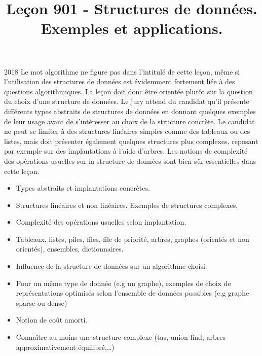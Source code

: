 \documentclass{agregfiche}
\title{Leçon 901 - Structures de données. Exemples et applications.}
\begin{document}
\maketitle

\secrapports
\begin{rapport}{2018}
	Le mot algorithme ne figure pas dans l’intitulé de cette leçon, même si l’utilisation des structures de
	données est évidemment fortement liée à des questions algorithmiques. La leçon doit donc être orientée
	plutôt sur la question du choix d’une structure de données. Le jury attend du candidat qu’il présente
	différents types abstraits de structures de données en donnant quelques exemples de leur usage avant de
	s’intéresser au choix de la structure concrète. Le candidat ne peut se limiter à des structures linéaires
	simples comme des tableaux ou des listes, mais doit présenter également quelques structures plus
	complexes, reposant par exemple sur des implantations à l’aide d’arbres. Les notions de complexité des
	opérations usuelles sur la structure de données sont bien sûr essentielles dans cette leçon.
\end{rapport}

\secindispensables

\begin{itemize}
	\item  Types abstraits et implantations concrètes.
    \item Structures linéaires et non linéaires. Exemples de structures complexes.
	\item Complexité des opérations usuelles selon implantation.
\end{itemize}

\secasavoir

\begin{itemize}
	\item  Tableaux, listes, piles, files, file de priorité, arbres, graphes (orientés et non orientés), ensembles, dictionnaires.
    \item Influence de la structure de données sur un algorithme choisi.
    \item Pour un même type de donnée (e.g un graphe), exemples de choix de représentations optimisés selon l'ensemble de données possibles (e.g graphe sparse ou dense)
	\item Notion de coût amorti.
    \item Connaître au moins une structure complexe (tas, union-find, arbres approximativement équilibré,\dots)

\end{itemize}
\end{document}
